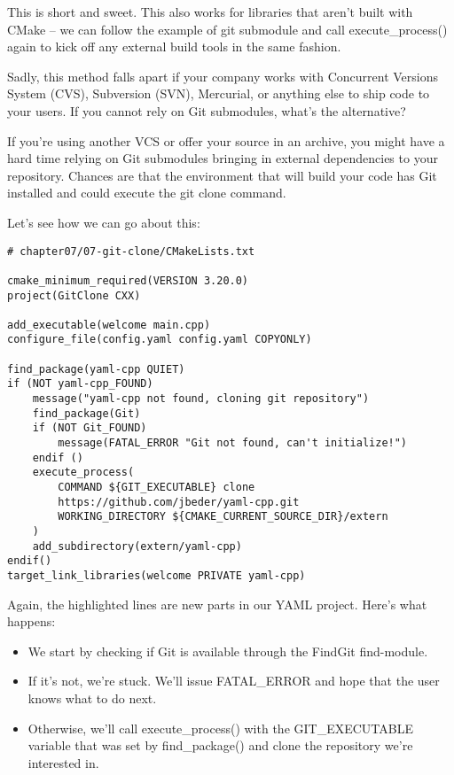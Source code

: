 This is short and sweet. This also works for libraries that aren't built with CMake – we can follow the example of git submodule and call execute\_process() again to kick off any external build tools in the same fashion.

Sadly, this method falls apart if your company works with Concurrent Versions System (CVS), Subversion (SVN), Mercurial, or anything else to ship code to your users. If you cannot rely on Git submodules, what's the alternative?


If you're using another VCS or offer your source in an archive, you might have a hard time relying on Git submodules bringing in external dependencies to your repository. Chances are that the environment that will build your code has Git installed and could execute the git clone command.

Let's see how we can go about this:

\begin{lstlisting}[style=styleCMake]
# chapter07/07-git-clone/CMakeLists.txt

cmake_minimum_required(VERSION 3.20.0)
project(GitClone CXX)

add_executable(welcome main.cpp)
configure_file(config.yaml config.yaml COPYONLY)

find_package(yaml-cpp QUIET)
if (NOT yaml-cpp_FOUND)
	message("yaml-cpp not found, cloning git repository")
	find_package(Git)
	if (NOT Git_FOUND)
		message(FATAL_ERROR "Git not found, can't initialize!")
	endif ()
	execute_process(
		COMMAND ${GIT_EXECUTABLE} clone
		https://github.com/jbeder/yaml-cpp.git
		WORKING_DIRECTORY ${CMAKE_CURRENT_SOURCE_DIR}/extern
	)
	add_subdirectory(extern/yaml-cpp)
endif()
target_link_libraries(welcome PRIVATE yaml-cpp)
\end{lstlisting}

Again, the highlighted lines are new parts in our YAML project. Here's what happens:

\begin{itemize}
\item 
We start by checking if Git is available through the FindGit find-module.

\item 
If it's not, we're stuck. We'll issue FATAL\_ERROR and hope that the user knows what to do next.

\item 
Otherwise, we'll call execute\_process() with the GIT\_EXECUTABLE variable that was set by find\_package() and clone the repository we're interested in.
\end{itemize}

